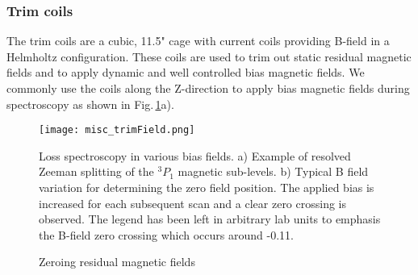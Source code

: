 
\subsubsection{Trim coils}
The trim coils are a cubic, 11.5" cage with current coils providing B-field in a Helmholtz configuration.
These coils are used to trim out static residual magnetic fields and to apply dynamic and well controlled bias magnetic fields.
We commonly use the coils along the Z-direction to apply bias magnetic fields during spectroscopy as shown in Fig.\,\ref{fig:trimField}a).
	\begin{figure}
		\centerline{
		\texttt{[image: misc\_trimField.png]}}
		\caption{Zeroing residual magnetic fields}{Loss spectroscopy in various bias fields. a) Example of resolved Zeeman splitting of the $^3P_1$ magnetic sub-levels. b) Typical B field variation for determining the zero field position. The applied bias is increased for each subsequent scan and a clear zero crossing is observed. The legend has been left in arbitrary lab units to emphasis the B-field zero crossing which occurs around -0.11.}
		\label{fig:trimField}
	\end{figure} 
	
